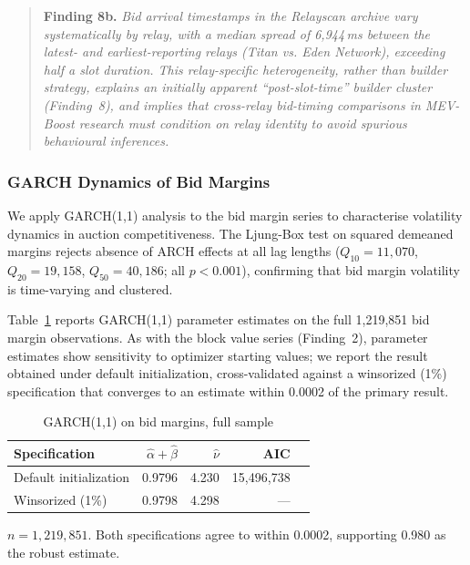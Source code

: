 \documentclass[11pt]{article}
\begin{document}
\begin{quote}
\textbf{Finding 8b.} \textit{Bid arrival timestamps in the Relayscan
archive vary systematically by relay, with a median spread of
6,944\,ms between the latest- and earliest-reporting relays
(Titan vs. Eden Network), exceeding half a slot duration. This
relay-specific heterogeneity, rather than builder strategy, explains an
initially apparent ``post-slot-time'' builder cluster (Finding~8), and
implies that cross-relay bid-timing comparisons in MEV-Boost research
must condition on relay identity to avoid spurious behavioural
inferences.}
\end{quote}

\subsubsection{GARCH Dynamics of Bid Margins}
\label{sec:margin_garch_sec}

We apply GARCH(1,1) analysis to the bid margin series to characterise
volatility dynamics in auction competitiveness. The Ljung-Box test on squared
demeaned margins rejects absence of ARCH effects at all lag lengths ($Q_{10}
= 11{,}070$, $Q_{20} = 19{,}158$, $Q_{50} = 40{,}186$; all $p < 0.001$),
confirming that bid margin volatility is time-varying and clustered.

Table~\ref{tab:margin_garch} reports GARCH(1,1) parameter estimates on the
full 1,219,851 bid margin observations. As with the block value series
(Finding~2), parameter estimates show sensitivity to optimizer starting
values; we report the result obtained under default initialization,
cross-validated against a winsorized (1\%) specification that converges to
an estimate within 0.0002 of the primary result.

\begin{table}[h]
\centering
\caption{GARCH(1,1) on bid margins, full sample}
\label{tab:margin_garch}
\begin{tabular}{lrrrl}
\toprule
Specification & $\hat\alpha+\hat\beta$ & $\hat\nu$ & AIC & \\
\midrule
Default initialization & 0.9796 & 4.230 & 15{,}496{,}738 & \\
Winsorized (1\%) & 0.9798 & 4.298 & --- & \\
\bottomrule
\end{tabular}
\vspace{0.5em}
\footnotesize $n = 1{,}219{,}851$. Both specifications agree to within
0.0002, supporting 0.980 as the robust estimate.
\end{table}
\end{document}

